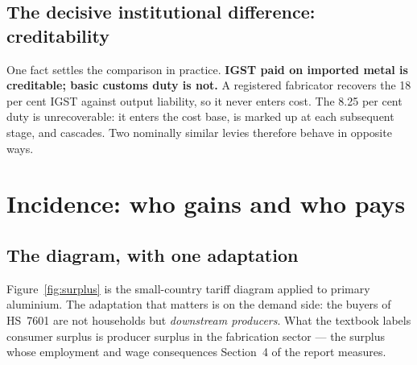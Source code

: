 \documentclass[11pt, a4paper]{article}
\begin{document}
\subsection{The decisive institutional difference: creditability}

One fact settles the comparison in practice. \textbf{IGST paid on imported metal is
creditable; basic customs duty is not.} A registered fabricator recovers the 18 per
cent IGST against output liability, so it never enters cost. The 8.25 per cent duty
is unrecoverable: it enters the cost base, is marked up at each subsequent stage, and
cascades. Two nominally similar levies therefore behave in opposite ways.

\section{Incidence: who gains and who pays}

\subsection{The diagram, with one adaptation}

Figure~\ref{fig:surplus} is the small-country tariff diagram applied to primary
aluminium. The adaptation that matters is on the demand side: the buyers of HS~7601
are not households but \emph{downstream producers}. What the textbook labels consumer
surplus is producer surplus in the fabrication sector --- the surplus whose employment
and wage consequences Section~4 of the report measures.
\end{document}
